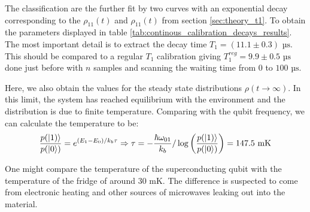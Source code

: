 The classification are the further fit by two curves with an exponential decay corresponding to the $\rho_{11}(t)$ and $\rho_{11}(t)$ from section \ref{sec:theory_t1}. To obtain the parameters displayed in table \ref{tab:continous_calibration_decays_results}. The most important detail is to extract the decay time $T_1 = (11.1\pm0.3) \text{ µs}$. This should be compared to a regular $T_1$ calibration giving $T_1^{reg} = 9.9 \pm 0.5 \text{ µs}$ done just before with $n$ samples and scanning the waiting time from $0 $ to $100 \text{ µs}$. 

Here, we also obtain the values for the steady state distributions $\rho(t \to \infty)$. In this limit, the system has reached equilibrium with the environment and the distribution is due to finite temperature. Comparing with the qubit frequency, we can calculate the temperature to be:
\begin{equation}
    \frac{p(\ket{1)}}{p(\ket{0})} = e^{(E_1 - E_0) / k_b \tau} \Rightarrow \tau = - \frac{\hbar \omega_{01}}{k_b} / \log\left(\frac{p(\ket{1)}}{p(\ket{0})} \right)  = 147.5 \text{ mK}
\end{equation}

One might compare the temperature of the superconducting qubit with the temperature of the fridge of around 30 mK. The difference is suspected to come from electronic heating and other sources of microwaves leaking out into the material.



